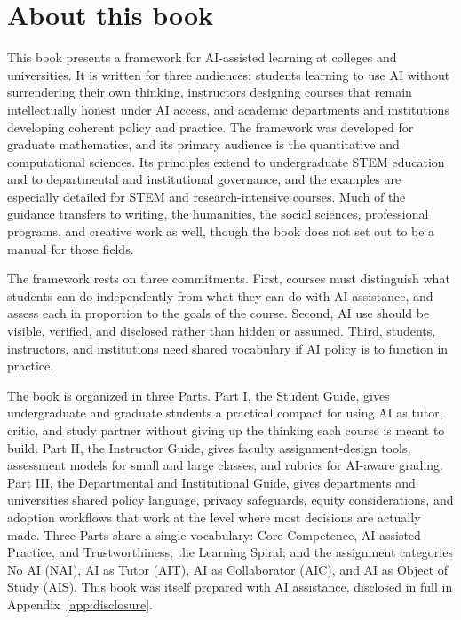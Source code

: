 \documentclass{SIAMbook2023}
\begin{document}
\section*{About this book}
This book presents a framework for AI-assisted learning at colleges and universities. It is written for three audiences: students learning to use AI without surrendering their own thinking, instructors designing courses that remain intellectually honest under AI access, and academic departments and institutions developing coherent policy and practice. The framework was developed for graduate mathematics, and its primary audience is the quantitative and computational sciences. Its principles extend to undergraduate STEM education and to departmental and institutional governance, and the examples are especially detailed for STEM and research-intensive courses. Much of the guidance transfers to writing, the humanities, the social sciences, professional programs, and creative work as well, though the book does not set out to be a manual for those fields.

The framework rests on three commitments. First, courses must distinguish what students can do independently from what they can do with AI assistance, and assess each in proportion to the goals of the course. Second, AI use should be visible, verified, and disclosed rather than hidden or assumed. Third, students, instructors, and institutions need shared vocabulary if AI policy is to function in practice.

The book is organized in three Parts. Part I, the Student Guide, gives undergraduate and graduate students a practical compact for using AI as tutor, critic, and study partner without giving up the thinking each course is meant to build. Part II, the Instructor Guide, gives faculty assignment-design tools, assessment models for small and large classes, and rubrics for AI-aware grading. Part III, the Departmental and Institutional Guide, gives departments and universities shared policy language, privacy safeguards, equity considerations, and adoption workflows that work at the level where most decisions are actually made. Three Parts share a single vocabulary: Core Competence, AI-assisted Practice, and Trustworthiness; the Learning Spiral; and the assignment categories No AI (NAI), AI as Tutor (AIT), AI as Collaborator (AIC), and AI as Object of Study (AIS). This book was itself prepared with AI assistance, disclosed in full in Appendix~\ref{app:disclosure}.
\end{document}
